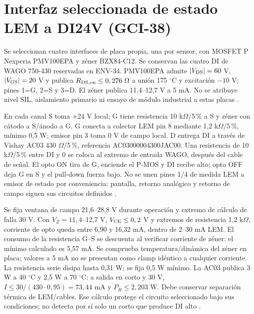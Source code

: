 \section{Interfaz seleccionada de estado LEM a DI24V (GCI-38)}
\label{sec:sd4-interfaz-gci38}
Se seleccionan cuatro interfaces de placa propia, una por sensor, con MOSFET P Nexperia PMV100EPA y zéner BZX84-C12. Se conservan las cuatro DI de WAGO 750-430 reservadas en ENV-34. PMV100EPA admite $|V_{\rm DS}|=60$ V, $|V_{\rm GS}|=20$ V y publica $R_{\rm DS,on}\le0,276~\Omega$ a unión 175 $^\circ$C y excitación $-10$ V; pines 1=G, 2=S y 3=D. El zéner publica 11,4--12,7 V a 5 mA. No se atribuye nivel SIL, aislamiento primario ni ensayo de módulo industrial a estas placas \parencites[pp.~1--3 y 6]{lote38-pmos}[pp.~2 y 6]{lote38-zener}.

En cada canal S toma +24 V local; G tiene resistencia 10 k$\Omega$/5\,\% a S y zéner con cátodo a S/ánodo a G. G conecta a colector LEM pin 8 mediante 1,2 k$\Omega$/5\,\%, mínimo 0,5 W; emisor pin 3 toma 0 V de campo local. D entrega DI a través de Vishay AC03 430 $\Omega$/5\,\%, referencia AC03000004300JAC00. Una resistencia de 10 k$\Omega$/5\,\% entre DI y 0 se coloca al extremo de entrada WAGO, después del cable de señal. El opto ON tira de G, enciende el P-MOS y DI recibe alto; opto OFF deja G en S y el pull-down fuerza bajo. No se unen pines 1/4 de medida LEM a emisor de estado por conveniencia: pantalla, retorno analógico y retorno de campo siguen sus circuitos definidos \parencites[pp.~8 y 10]{lote35-lem200}[p.~2]{lote38-pmos}[pp.~1--2]{lote38-ac}.

Se fija ventana de campo 21,6--28,8 V durante operación y extremo de cálculo de falla 30 V. Con $V_Z=11,4$--12,7 V, $V_{\rm CE}\le0,2$ V y extremos de resistencia 1,2 k$\Omega$, corriente de opto queda entre 6,90 y 16,32 mA, dentro de 2--30 mA LEM. El consumo de la resistencia G--S se descuenta al verificar corriente de zéner: el mínimo calculado es 5,57 mA. Se comprueba temperatura/dinámica del zéner en placa; valores a 5 mA no se presentan como clamp idéntico a cualquier corriente. La resistencia serie disipa hasta 0,31 W; se fija 0,5 W mínimo. La AC03 publica 3 W a 40 $^\circ$C y 2,5 W a 70 $^\circ$C: a salida en corto y 30 V, $I\le30/(430\cdot0,95)=73,44$ mA y $P_R\le2,203$ W. Debe conservar separación térmica de LEM/cables. Ese cálculo protege el circuito seleccionado bajo sus condiciones; no detecta por sí solo un corto que produce DI alto \parencites[p.~8]{lote35-lem200}[p.~1]{lote38-ac}[pp.~3 y 6]{lote38-pmos}.

